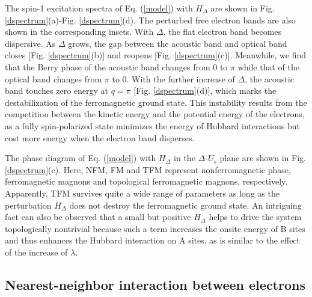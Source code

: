 \documentclass[amsmath,superscriptaddress,showpacs,aps,prb,twocolumn]{revtex4-1}
\begin{document}
\par The spin-1 excitation spectra of Eq. (\ref{model}) with $H_\Delta$ are shown in Fig. \ref{dspectrum}(a)-Fig. \ref{dspectrum}(d). The perturbed free electron bands are also shown in the corresponding insets. With $\Delta$, the flat electron band becomes dispersive. As $\Delta$ grows, the gap between the acoustic band and optical band closes [Fig. \ref{dspectrum}(b)] and reopens [Fig. \ref{dspectrum}(c)]. Meanwhile, we find that the Berry phase of the acoustic band changes from $0$ to $\pi$ while that of the optical band changes from $\pi$ to $0$. With the further increase of $\Delta$, the acoustic band touches zero energy at $q=\pi$ [Fig. \ref{dspectrum}(d)], which marks the destabilization of the ferromagnetic ground state. This instability results from the competition between the kinetic energy and the potential energy of the electrons, as a fully spin-polarized state minimizes the energy of Hubbard interactions but cost more energy when the electron band disperses.

\par The phase diagram of Eq. (\ref{model}) with $H_\Delta$ in the $\Delta$-$U_s$ plane are shown in Fig. \ref{dspectrum}(e). Here, NFM, FM and TFM represent nonferromagnetic phase, ferromagnetic magnons and topological ferromagnetic magnons, respectively. Apparently, TFM survives quite a wide range of parameters as long as the perturbation $H_\Delta$ does not destroy the ferromagnetic ground state. An intriguing fact can also be observed that a small but positive $H_\Delta$ helps to drive the system topologically nontrivial because such a term increases the onsite energy of B sites and thus enhances the Hubbard interaction on A sites, as is similar to the effect of the increase of $\lambda$.

\subsection{Nearest-neighbor interaction between electrons}
\end{document}
